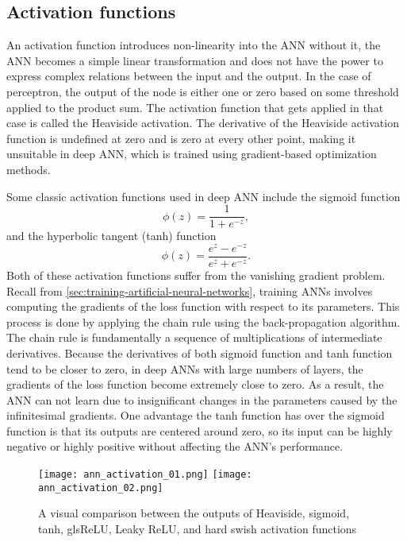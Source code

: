 \subsection{Activation functions}

An activation function introduces non-linearity into the \gls{ANN} without it, the \gls{ANN} becomes a simple linear transformation and does not have the power to express complex relations between the input and the output.
In the case of perceptron, the output of the node is either one or zero based on some threshold applied to the product sum.
The activation function that gets applied in that case is called the Heaviside activation.
The derivative of the Heaviside activation function is undefined at zero and is zero at every other point, making it unsuitable in deep \gls{ANN}, which is trained using gradient-based optimization methods.

Some classic activation functions used in deep \gls{ANN} include the sigmoid function
\begin{equation*}
    \phi(z) = \frac{1}{1 + e^{-z}},
\end{equation*}
and the hyperbolic tangent (tanh) function
\begin{equation*}
    \phi(z) = \frac{e^z - e^{-z}}{e^z + e^{-z}}.
\end{equation*}
Both of these activation functions suffer from the vanishing gradient problem.
Recall from \autoref{sec:training-artificial-neural-networks}, training \glspl{ANN} involves computing the gradients of the loss function with respect to its parameters.
This process is done by applying the chain rule using the back-propagation algorithm.
The chain rule is fundamentally a sequence of multiplications of intermediate derivatives.
Because the derivatives of both sigmoid function and tanh function tend to be closer to zero, in deep \glspl{ANN} with large numbers of layers, the gradients of the loss function become extremely close to zero.
As a result, the \gls{ANN} can not learn due to insignificant changes in the parameters caused by the infinitesimal gradients.
One advantage the tanh function has over the sigmoid function is that its outputs are centered around zero, so its input can be highly negative or highly positive without affecting the \gls{ANN}'s performance.

\begin{figure}[h]
    \centering
    \texttt{[image: ann\_activation\_01.png]}
    \texttt{[image: ann\_activation\_02.png]}
    \caption{A visual comparison between the outputs of Heaviside, sigmoid, tanh, gls{ReLU}, Leaky ReLU, and hard swish activation functions}
    \label{fig:heaviside-sigmoid-tanh}
\end{figure}

